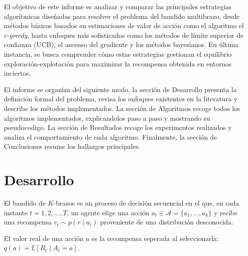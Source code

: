     El objetivo de este informe es analizar y comparar las principales estrategias algorítmicas diseñadas para resolver el problema del bandido multibrazo, desde métodos básicos basados en estimaciones de valor de acción como el algoritmo el $\varepsilon$-\textit{greedy}, hasta enfoques más sofisticados como los métodos de límite superior de confianza (UCB), el ascenso del gradiente y los métodos bayesianos. En última instancia, se busca comprender cómo estas estrategias gestionan el equilibrio exploración-explotación para maximizar la recompensa obtenida en entornos inciertos. 

    El informe se organiza del siguiente modo, la sección de Desarrollo presenta la definición formal del problema, revisa los enfoques existentes en la literatura y describe los métodos implementados. La sección de Algoritmos recoge todos los algoritmos implementados, explicandolos paso a paso y mostrando su pseudocodigo. La sección de Resultados recoge los experimentos realizados y analiza el comportamiento de cada algoritmo. Finalmente, la sección de Conclusiones resume los hallazgos principales.


\section{Desarrollo}

El bandido de $K$-brazos \cite{robbins1952} es un proceso de decisión secuencial en el que, en cada instante $t = 1,2,\dots,T$, un agente elige una acción $a_t \in \mathcal{A} = \{a_1,\dots,a_k\}$ y recibe una recompensa $r_t \sim p(r \mid a_t)$ proveniente de una distribución desconocida.

\begin{definition}
El valor real de una acción $a$ es la recompensa esperada al seleccionarla: $q(a) = \mathbb{E}[R_t \mid A_t = a]$.
\end{definition}

